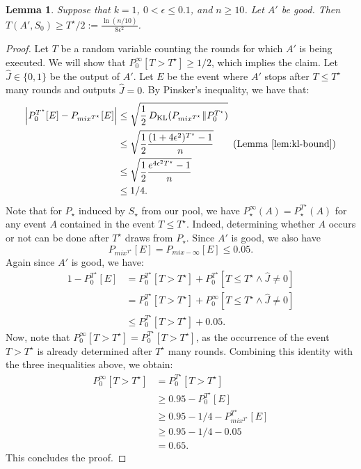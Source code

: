 \documentclass[a4paper,11pt]{article}
\newtheorem{lemma}[theorem]{Lemma}
\theoremstyle{definition}
\newcommand{\KL}{\mathop{D_{\mathrm{KL}}}\limits}
\begin{document}
\begin{lemma} \label{lem:one-batch-lower-bound}
    Suppose that $k=1$, $0 < \epsilon \leq 0.1$, and $n \geq 10$. Let $A'$ be good. Then $T(A',S_0) \geq T^\star/2 := \frac{\ln (n/10)}{8 \epsilon^2}$.
\end{lemma}

\begin{proof}
    Let $T$ be a random variable counting the rounds for which $A'$ is being executed. 
    We will show that $P_0^{\infty}[T > T^\star] \geq 1/2$, which implies the claim.
    Let $\hat{J} \in \{0,1\}$ be the output of $A'$. Let $E$ be the event where $A'$ stops after $T \leq T^\star$ many rounds and outputs  $\hat{J} = 0$. 
    By Pinsker's inequality, we have that:
    \begin{align*}
        \mleft \lvert P_0^{T^\star}[E] - P_{mix^{T^\star}}[E] \mright \rvert
        &\leq
        \sqrt{\frac{1}{2}\KL(P_{mix^{T^\star}} \lVert P_0^{T^\star})} \\
        & \leq
        \sqrt{\frac{1}{2}\frac{(1 + 4 \epsilon^2)^{T^\star}-1}{n}} \tag{Lemma~\ref{lem:kl-bound}}\\
        & \leq
        \sqrt{\frac{1}{2}\frac{e^{4 \epsilon^2 T^\star}-1}{n}} \\
        & \leq 1/4.
    \end{align*}
    Note that for $P_\star$ induced by $S_\star$ from our pool, we have $P^\infty_\star (A) = P^{T^\star}_\star(A)$ for any event $A$ contained in the event $T \leq T^\star$. Indeed, determining whether $A$ occurs or not can be done after $T^\star$ draws from $P_\star$. Since $A'$ is good, we also have
    \[
    P_{mix^{T^\star}}[E] = P_{mix-\infty}[E] \leq 0.05. 
    \]
    Again since $A'$ is good, we have:
    \begin{align*}
        1- P_0^{T^\star}[E] &= P_0^{T^\star}[T > T^\star] + P_0^{T^\star}[T \leq T^\star \wedge \hat{J} \neq 0]\\
                        &=
                        P_0^{T^\star}[T > T^\star] + P_0^{\infty}[T \leq T^\star \wedge \hat{J} \neq 0] \\
                        &\leq
                        P_0^{T^\star}[T > T^\star] + 0.05.
    \end{align*}
    Now, note that $P_0^{\infty}[T > T^\star] = P_0^{T^\star}[T > T^\star]$, as the occurrence of the event $T > T^\star$ is already determined after $T^\star$ many rounds.
    Combining this identity with the three inequalities above, we obtain:
    \begin{align*}
        P_0^{\infty}[T > T^\star] &= P_0^{T^\star}[T > T^\star] \\
                              &\geq 0.95 - P_0^{T^\star}[E]\\
                              &\geq 0.95  - 1/4 - P_{mix^{T^\star}}^{T^\star}[E]\\
                              &\geq 0.95 - 1/4 - 0.05 \\
                              &= 0.65.
    \end{align*}
    This concludes the proof.
\end{proof}
\end{document}
